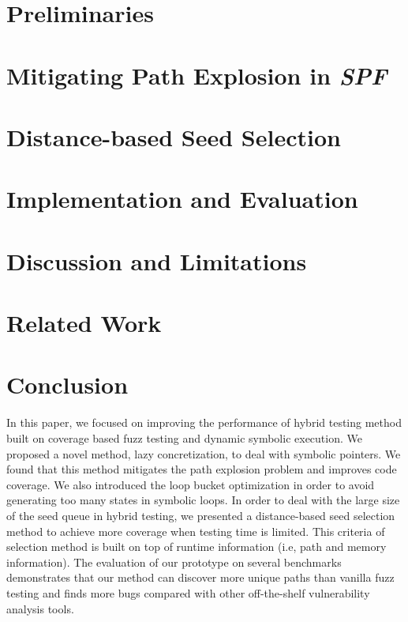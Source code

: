 \documentclass{cta-author}
\begin{document}
\section{Preliminaries} \label{sec:preliminaries}


\section{Mitigating Path Explosion in \textit{SPF}} \label{sec:ease PE}

%
\section{Distance-based Seed Selection} \label{sec:seed selection}

%
\section{Implementation and Evaluation} \label{sec:evaluate}




\section{Discussion and Limitations} \label{sec:discussion}


\section{Related Work} \label{sec:related}


\section{Conclusion} \label{sec:conclusion}
In this paper, we focused on improving the performance of hybrid testing method built on coverage based fuzz testing and dynamic symbolic execution. We proposed a novel method, lazy concretization, to deal with symbolic pointers. We found that this method mitigates the path explosion problem and improves code coverage. We also introduced the loop bucket optimization in order to avoid generating too many states in symbolic loops. In order to deal with the large size of the seed queue in hybrid testing, we presented a distance-based seed selection method to achieve more coverage when testing time is limited. This criteria of selection method is built on top of runtime information (i.e, path and memory information). The evaluation of our prototype on several benchmarks demonstrates that our method can discover more unique paths than vanilla fuzz testing and finds more bugs compared with other off-the-shelf vulnerability analysis tools.
\end{document}
